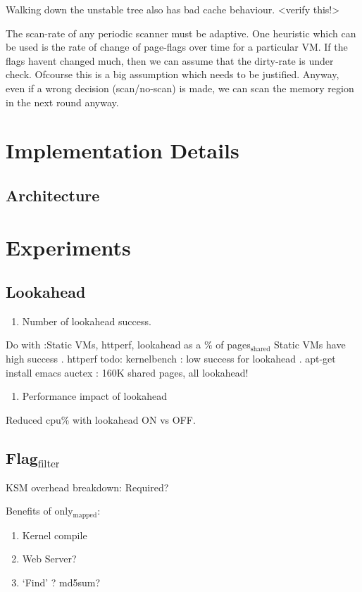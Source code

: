 \documentclass[11pt]{article}
\begin{document}
Walking down the unstable tree also has bad cache behaviour. <verify this!>

The scan-rate of any periodic scanner must be adaptive. One heuristic which can be used is the rate of change of page-flags over time for a particular VM.
If the flags havent changed much, then we can assume that the dirty-rate is under check. Ofcourse this is a big assumption which needs to be justified. 
Anyway, even if a wrong decision (scan/no-scan) is made, we can scan the memory region in the next round anyway. 
\section{Implementation Details}
\label{sec-12}
\subsection{Architecture}
\label{sec-12_1}
\section{Experiments}
\label{sec-13}
\subsection{Lookahead}
\label{sec-13_1}

\begin{enumerate}
\item Number of lookahead success.
\end{enumerate}
Do with :Static VMs, httperf, lookahead as a \% of pages$_{\mathrm{shared}}$
Static VMs have high success .
httperf todo:
kernelbench : low success for lookahead .
apt-get install emacs auctex : 160K shared pages, all lookahead!
\begin{enumerate}
\item Performance impact of lookahead
\end{enumerate}
Reduced cpu\% with lookahead ON vs OFF.
\subsection{Flag$_{\mathrm{filter}}$}
\label{sec-13_2}




KSM overhead breakdown:
Required?

Benefits of only$_{\mathrm{mapped}}$:

\begin{enumerate}
\item Kernel compile
\item Web Server?
\item `Find' ? md5sum?
\end{enumerate}
\end{document}
